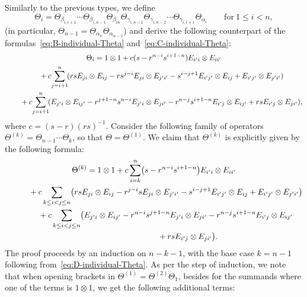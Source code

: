 \documentclass[pdftex]{sigma}
\numberwithin{equation}{section}
\begin{document}
Similarly to the previous types, we define
\begin{displaymath}
 \Theta_{i} = \Theta_{\beta_{i,i+1}}\cdots \Theta_{\beta_{i,n-1}}\Theta_{\beta_{in}}
 \Theta_{\gamma_{i,n-1}}\Theta_{\gamma_{i,n-2}}\cdots \Theta_{\gamma_{i,i+1}}\Theta_{\alpha_{i}}
 \qquad \mathrm{for} \ 1 \le i < n,
\end{displaymath}
 (in particular, $\Theta_{n-1}=\Theta_{\alpha_n}\Theta_{\alpha_{n-1}}$) and derive the following counterpart of the formulas~\eqref{eq:B-individual-Theta} and~\eqref{eq:C-individual-Theta}:
\begin{gather}
 \Theta_{i} = 1 \otimes 1 + c(s - r^{n - i}s^{i + 1 - n})E_{i'i} \otimes E_{ii'}\label{eq:D-individual-Theta} \\
 \hphantom{\Theta_{i} =}{}
 \!+ c\!\sum_{j = i + 1}^{n}\!(rsE_{ji} \otimes E_{ij} - rs^{j - i}E_{ji} \otimes E_{j'i'} - s^{i - j + 1}E_{i'j'} \otimes E_{ij} + E_{i'j'} \otimes E_{j'i'})\nonumber \\
 \hphantom{\Theta_{i} =}{}
 \!+ c\!\sum_{j = i + 1}^{n}\!(E_{j'i} \otimes E_{ij'} - r^{j + 1 - n}s^{n - i}E_{j'i} \otimes E_{ji'} - r^{n - j}s^{i + 1 - n}E_{i'j} \otimes E_{ij'} + rsE_{i'j} \otimes E_{ji'}),\nonumber
\end{gather}
where $c = (s - r)(rs)^{-1}$. Consider the following family of operators $\Theta^{(k)}=\Theta_{n-1} \cdots \Theta_{k}$, so that $\Theta=\Theta^{(1)}$. We claim that $\Theta^{(k)}$ is explicitly given by the following formula:
{\samepage\begin{gather}
 \Theta^{(k)} = 1 \otimes 1 + c \sum_{i = k}^{n}\bigl(s - r^{n - i}s^{i + 1 - n}\bigr)E_{i'i} \otimes E_{ii'}\nonumber \\
 \hphantom{\Theta^{(k)} =}{}
 + c\sum_{k \le i < j \le n}\bigl(rsE_{ji} \otimes E_{ij} - r^{j - i}s E_{ji} \otimes E_{j'i'} - s^{i - j + 1}E_{i'j'} \otimes E_{ij} + E_{i'j'} \otimes E_{j'i'}\bigr)\nonumber \\
 \hphantom{\Theta^{(k)} =}{}
 + c\sum_{k \le i < j \le n}\bigl(E_{j'i} \otimes E_{ij'} - r^{n - i}s^{j + 1- n}E_{j'i} \otimes E_{ji'} - r^{n - j}s^{i+ 1 - n}E_{i'j} \otimes E_{ij'}\nonumber\\
 \hphantom{\Theta^{(k)} =+ c\sum_{k \le i < j \le n}\bigl(}{}
 + rsE_{i'j} \otimes E_{ji'}\bigr).\label{eq:D-Theta_k}
\end{gather}
The proof proceeds by an induction on $n-k - 1$, with the base case $k=n-1$ following from~\eqref{eq:D-individual-Theta}.}
As per the step of induction, we note that when opening brackets in $\Theta^{(1)}=\Theta^{(2)}\Theta_1$, besides for the summands where one of the terms is $1\otimes 1$, we get the following additional terms:
\end{document}
